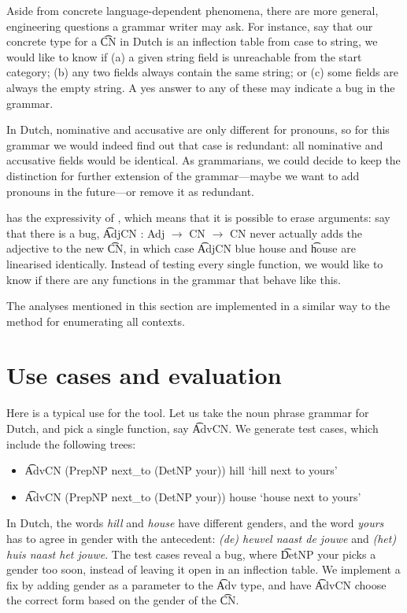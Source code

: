 Aside from concrete language-dependent phenomena, there are more
general, engineering questions a grammar writer may ask. For instance, say that our
concrete type for a \t{CN} in Dutch is an inflection table from case
to string, we would like to know if (a) a given string field is unreachable from the start category; (b) any two fields always contain the same string; or (c) some fields
are always the empty string. A yes answer to any of these may indicate a bug in the grammar.

In Dutch, nominative and accusative are only different for
pronouns, so for this grammar we would indeed find out that case is
redundant: all nominative and accusative fields would be
identical. As grammarians, we could decide to keep the distinction for
further extension of the grammar---maybe we want to add pronouns in
the future---or remove it as redundant.

\gf{} has the expressivity of \pmcfg{}, which means that it is
possible to erase arguments: say that there is a bug, \t{AdjCN : Adj
  $\rightarrow$ CN  $\rightarrow$ CN} never actually adds the
adjective to the new \t{CN}, in which case \t{AdjCN blue house} and
\t{house} are linearised identically. Instead of testing every single
function, we would like to know if there are any functions in the
grammar that behave like this.

The analyses mentioned in this section are implemented in a similar way to the method for enumerating all contexts.

\section{Use cases and evaluation}

Here is a typical use for the tool. 
Let us take the noun phrase grammar for Dutch, and pick a single function,
say \t{AdvCN}. We generate test cases, which include the following
trees: 
\begin{itemize}
\item \t{AdvCN (PrepNP next\_to (DetNP your)) hill} `hill next to
yours'
\item \t{AdvCN (PrepNP next\_to (DetNP your)) house} `house next
to yours'
\end{itemize}
In Dutch, the words \emph{hill} and \emph{house} have different
genders, and the word \emph{yours} has to agree in gender 
with the antecedent: \emph{(de) heuvel naast de jouwe} and \emph{(het)
  huis naast het jouwe}. The test cases reveal a bug, where \t{DetNP your} 
picks a gender too soon, instead of leaving it open in an inflection
table. We implement a fix by adding gender as a parameter to the
\t{Adv} type, and have \t{AdvCN} choose the correct form based on the gender of the \t{CN}. 

